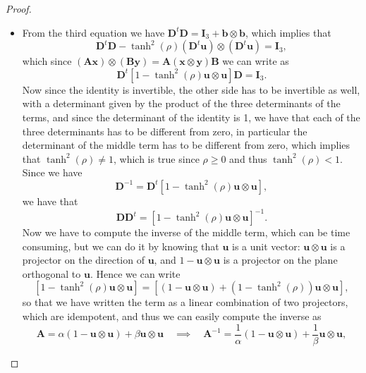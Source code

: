 \begin{proof}
\begin{itemize}
              \[
                  \mathbf{b} = -\eta \tanh(\rho) \mathbf{D}^t \mathbf{u}.
              \]
              We will understand the form of \(\mathbf{D}\) and then we will be able to write \(\mathbf{b}\) in a more explicit form.
        \item From the third equation we have \(\mathbf{D}^t \mathbf{D} = \mathbf{I}_3 + \mathbf{b} \otimes \mathbf{b}\), which implies that
              \[
                  \mathbf{D}^t \mathbf{D} - \tanh^2(\rho) (\mathbf{D}^t \mathbf{u}) \otimes (\mathbf{D}^t \mathbf{u}) = \mathbf{I}_3,
              \]
              which since \((\mathbf{A}\mathbf{x})\otimes(\mathbf{B}\mathbf{y}) = \mathbf{A} (\mathbf{x} \otimes \mathbf{y}) \mathbf{B}\) we can write as
              \[
                  \mathbf{D}^t \left[ 1 - \tanh^2(\rho) \mathbf{u} \otimes \mathbf{u} \right] \mathbf{D} = \mathbf{I}_3.
              \]
              Now since the identity is invertible, the other side has to be invertible as well, with a determinant given by the product of the three determinants of the terms, and since the determinant of the identity is 1, we have that each of the three determinants has to be different from zero, in particular the determinant of the middle term has to be different from zero, which implies that \(\tanh^2(\rho) \neq 1\), which is true since \(\rho \geq 0\) and thus \(\tanh^2(\rho) < 1\). Since we have
              \[
                  \mathbf{D}^{-1} = \mathbf{D}^t \left[ 1 - \tanh^2(\rho) \mathbf{u} \otimes \mathbf{u} \right],
              \]
              we have that
              \[
                  \mathbf{D} \mathbf{D}^t = \left[ 1 - \tanh^2(\rho) \mathbf{u} \otimes \mathbf{u} \right]^{-1}.
              \]
              Now we have to compute the inverse of the middle term, which can be time consuming, but we can do it by knowing that \(\mathbf{u}\) is a unit vector: \(\mathbf{u} \otimes \mathbf{u} \) is a projector on the direction of \(\mathbf{u}\), and \(1 - \mathbf{u} \otimes \mathbf{u}\) is a projector on the plane orthogonal to \(\mathbf{u}\). Hence we can write
              \[
                  \left[ 1 - \tanh^2(\rho) \mathbf{u} \otimes \mathbf{u} \right] = \left[ \left(1 - \mathbf{u} \otimes \mathbf{u} \right) + \left(1 - \tanh^2(\rho) \right) \mathbf{u} \otimes \mathbf{u} \right],
              \]
              so that we have written the term as a linear combination of two projectors, which are idempotent, and thus we can easily compute the inverse as
              \[
                  \mathbf{A} = \alpha (1 - \mathbf{u} \otimes \mathbf{u}) + \beta \mathbf{u} \otimes \mathbf{u} \quad \implies \quad \mathbf{A}^{-1} = \frac{1}{\alpha} (1 - \mathbf{u} \otimes \mathbf{u}) + \frac{1}{\beta} \mathbf{u} \otimes \mathbf{u},
\]
\end{itemize}
\end{proof}
